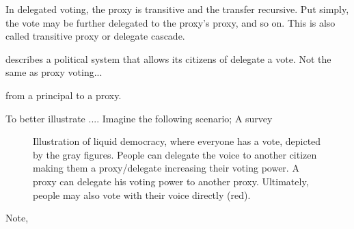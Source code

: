 In delegated voting, the proxy is transitive and the transfer recursive. Put simply, the vote may be further delegated to the proxy's proxy, and so on. This is also called transitive proxy or delegate cascade. 

describes a political system that allows its citizens of delegate a vote. Not the same as proxy voting...

from a principal to a proxy. 

To better illustrate ....
Imagine the following scenario; A survey 

\begin{figure}[H]
	\centering {}
    \caption[Illustration of liquid democracy]{Illustration of liquid democracy, where everyone has a vote, depicted by the gray figures. People can delegate the voice to another citizen making them a proxy/delegate increasing their voting power. A proxy can delegate his voting power to another proxy. Ultimately, people may also vote with their voice directly (red).}
	\label{fig:Liquid-Democracy-Delegated-Voting}
\end{figure}
Note, 

